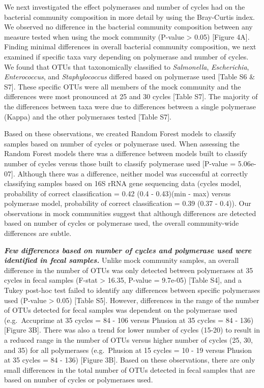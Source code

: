 \documentclass[11pt,]{article}
\begin{document}
We next investigated the effect polymerases and number of cycles had on
the bacterial community composition in more detail by using the
Bray-Curtis index. We observed no difference in the bacterial community
composition between any measure tested when using the mock community
(P-value \textgreater{} 0.05) {[}Figure 4A{]}. Finding minimal
differences in overall bacterial community composition, we next examined
if specific taxa vary depending on polymerase and number of cycles. We
found that OTUs that taxonomically classified to \emph{Salmonella},
\emph{Escherichia}, \emph{Enterococcus}, and \emph{Staphylococcus}
differed based on polymerase used {[}Table S6 \& S7{]}. These specific
OTUs were all members of the mock community and the differences were
most pronounced at 25 and 30 cycles {[}Table S7{]}. The majority of the
differences between taxa were due to differences between a single
polymerase (Kappa) and the other polymerases tested {[}Table S7{]}.

Based on these observations, we created Random Forest models to classify
samples based on number of cycles or polymerase used. When assessing the
Random Forest models there was a difference between models built to
classify number of cycles versus those built to classify polymerase used
{[}P-value = 5.06e-07{]}. Although there was a difference, neither model
was successful at correctly classifying samples based on 16S rRNA gene
sequencing data (cycles model, probability of correct classification =
0.42 (0.4 - 0.43)(min - max) versus polymerase model, probability of
correct classification = 0.39 (0.37 - 0.4)). Our observations in mock
communities suggest that although differences are detected based on
number of cycles or polymerase used, the overall community-wide
differences are subtle.

\textbf{\emph{Few differences based on number of cycles and polymerase
used were identified in fecal samples.}} Unlike mock community samples,
an overall difference in the number of OTUs was only detected between
polymerases at 35 cycles in fecal samples (F-stat \textgreater{} 16.35,
P-value = 9.7e-05) {[}Table S4{]}, and a Tukey post-hoc test failed to
identify any differences between specific polymerases used (P-value
\textgreater{} 0.05) {[}Table S5{]}. However, differences in the range
of the number of OTUs detected for fecal samples was dependent on the
polymerase used (e.g.~Accuprime at 35 cycles = 84 - 106 versus Phusion
at 35 cycles = 84 - 136) {[}Figure 3B{]}. There was also a trend for
lower number of cycles (15-20) to result in a reduced range in the
number of OTUs versus higher number of cycles (25, 30, and 35) for all
polymerases (e.g.~Phusion at 15 cycles = 10 - 19 versus Phusion at 35
cycles = 84 - 136) {[}Figure 3B{]}. Based on these observations, there
are only small differences in the total number of OTUs detected in fecal
samples that are based on number of cycles or polymerases used.
\end{document}
